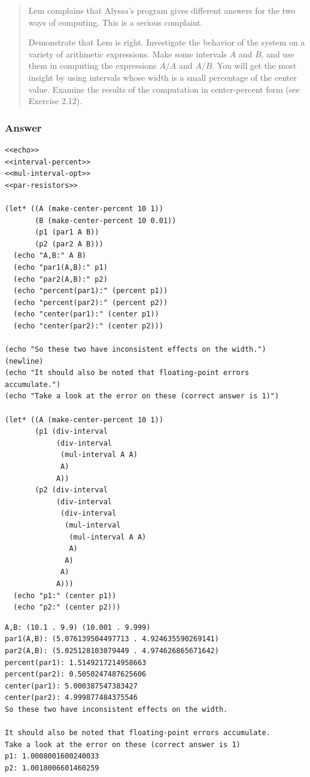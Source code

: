 \documentclass[final,fleqn,titlepage,twoside]{article}
\begin{document}
\begin{quote}
Lem complains that Alyssa's program gives different answers for the two ways of
computing. This is a serious complaint.

Demonstrate that Lem is right. Investigate the behavior of the system on a
variety of arithmetic expressions. Make some intervals \(A\) and \(B\), and use
them in computing the expressions \(A / A\) and \(A / B\). You will get the most
insight by using intervals whose width is a small percentage of the center
value. Examine the results of the computation in center-percent form (see
Exercise 2.12).
\end{quote}

\subsubsection{Answer}
\label{sec:orgdfa2126}
\begin{verbatim}
<<echo>>
<<interval-percent>>
<<mul-interval-opt>>
<<par-resistors>>

(let* ((A (make-center-percent 10 1))
       (B (make-center-percent 10 0.01))
       (p1 (par1 A B))
       (p2 (par2 A B)))
  (echo "A,B:" A B)
  (echo "par1(A,B):" p1)
  (echo "par2(A,B):" p2)
  (echo "percent(par1):" (percent p1))
  (echo "percent(par2):" (percent p2))
  (echo "center(par1):" (center p1))
  (echo "center(par2):" (center p2)))

(echo "So these two have inconsistent effects on the width.")
(newline)
(echo "It should also be noted that floating-point errors accumulate.")
(echo "Take a look at the error on these (correct answer is 1)")

(let* ((A (make-center-percent 10 1))
       (p1 (div-interval
            (div-interval
             (mul-interval A A)
             A)
            A))
       (p2 (div-interval
            (div-interval
             (div-interval
              (mul-interval
               (mul-interval A A)
               A)
              A)
             A)
            A)))
  (echo "p1:" (center p1))
  (echo "p2:" (center p2)))
\end{verbatim}

\begin{verbatim}
A,B: (10.1 . 9.9) (10.001 . 9.999) 
par1(A,B): (5.076139504497713 . 4.924635590269141) 
par2(A,B): (5.025128103079449 . 4.974626865671642) 
percent(par1): 1.5149217214958663 
percent(par2): 0.5050247487625606 
center(par1): 5.000387547383427 
center(par2): 4.999877484375546 
So these two have inconsistent effects on the width. 

It should also be noted that floating-point errors accumulate. 
Take a look at the error on these (correct answer is 1) 
p1: 1.0008001600240033 
p2: 1.0018006601460259 
\end{verbatim}
\end{document}
